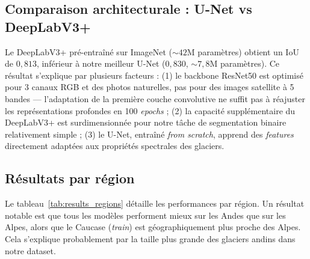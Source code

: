 \documentclass[11pt]{article}
\begin{document}
\subsection{Comparaison architecturale : U-Net vs DeepLabV3+}
Le DeepLabV3+ pré-entraîné sur ImageNet (${\sim}42$M paramètres) obtient un IoU de $0{,}813$, inférieur à notre meilleur U-Net ($0{,}830$, ${\sim}7{,}8$M paramètres). Ce résultat s'explique par plusieurs facteurs : (1) le backbone ResNet50 est optimisé pour 3 canaux RGB et des photos naturelles, pas pour des images satellite à 5 bandes --- l'adaptation de la première couche convolutive ne suffit pas à réajuster les représentations profondes en 100 \emph{epochs} ; (2) la capacité supplémentaire du DeepLabV3+ est surdimensionnée pour notre tâche de segmentation binaire relativement simple ; (3) le U-Net, entraîné \emph{
from scratch}, apprend des \emph{features} directement adaptées aux propriétés spectrales des glaciers.
 
\subsection{Résultats par région}
Le tableau~\ref{tab:results_regions} détaille les performances par
région. Un résultat notable est que tous les modèles performent
mieux sur les Andes que sur les Alpes, alors que le Caucase
(\textit{train}) est géographiquement plus proche des Alpes. Cela
s'explique probablement par la taille plus grande des glaciers
andins dans notre dataset.
\end{document}
